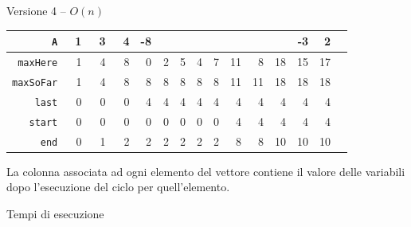 \begin{frame}[fragile]{Versione 4  -- $O(n)$}

\small
\begin{tabular}{|r|r|r|r|r|r|r|r|r|r|r|r|r|r|r|}
\hline
       \texttt{A} & ~1 & ~3 & ~4 & -8 & ~\cellcolor{red!30}{2} & \cellcolor{red!30}{~3} & \cellcolor{red!30}{-1} & \cellcolor{red!30}{~3} & \cellcolor{red!30}{~4} & \cellcolor{red!30}{-3} & \cellcolor{red!30}{10} & -3 &  2 \\\hline\hline
 \texttt{maxHere} & 1 & 4 & 8 & 0 & 2 & 5 & 4 & 7 & 11 &  8 & 18 & 15 & 17 \\\hline
\texttt{maxSoFar} & 1 & 4 & 8 & 8 & 8 & 8 & 8 & 8 & 11 & 11 & 18 & 18 & 18 \\\hline
    \texttt{last} & 0 & 0 & 0 & 4 & 4 & 4 & 4 & 4 &  4 &  4 &  4 &  4 &  4 \\\hline
   \texttt{start} & 0 & 0 & 0 & 0 & 0 & 0 & 0 & 0 &  4 &  4 &  4 &  4 &  4 \\\hline
     \texttt{end} & 0 & 1 & 2 & 2 & 2 & 2 & 2 & 2 &  8 &  8 & 10 & 10 & 10 \\\hline
\end{tabular}



\begingroup
\bigskip
La colonna associata ad ogni elemento del vettore contiene il valore
delle variabili dopo l'esecuzione del ciclo per quell'elemento.
\endgroup

\end{frame}

\begin{frame}{Tempi di esecuzione}
    
\end{frame}


